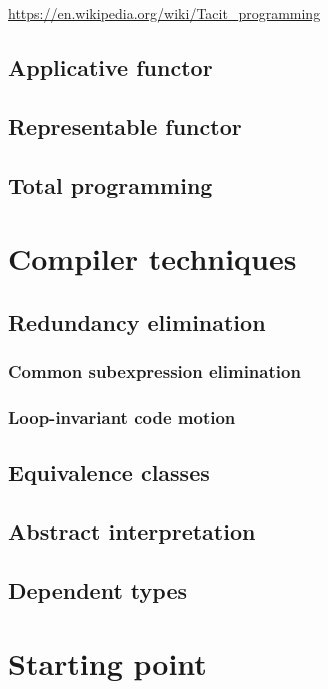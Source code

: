 \url{https://en.wikipedia.org/wiki/Tacit_programming}

\subsection{Applicative functor}

\subsection{Representable functor}

\subsection{Total programming}

\section{Compiler techniques}

\subsection{Redundancy elimination}

\subsubsection{Common subexpression elimination}

\subsubsection{Loop-invariant code motion}

\subsection{Equivalence classes}

\subsection{Abstract interpretation}

\subsection{Dependent types}

\section{Starting point}

